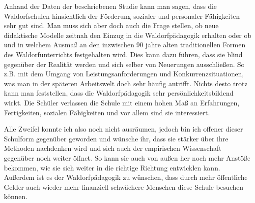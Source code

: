 Anhand der Daten der beschriebenen Studie kann man sagen, dass die Waldorfschulen hinsichtlich der Förderung sozialer und personaler Fähigkeiten sehr gut sind. Man muss sich aber doch auch die Frage stellen, ob neue didaktische Modelle zeitnah den Einzug in die Waldorfpädagogik erhalten oder ob und in welchem Ausmaß an den inzwischen 90 jahre alten traditionellen Formen des Waldorfunterrichts festgehalten wird. Dies kann dazu führen, dass sie blind gegenüber der Realität werden und sich selber von Neuerungen ausschließen. So z.B. mit dem Umgang von Leistungsanforderungen und Konkurrenzsituationen, was man in der späteren Arbeitswelt doch sehr häufig antrifft. Nichts desto trotz kann man feststellen, dass die Waldorfpädagogik sehr persönlichkeitsbildend wirkt. Die Schüler verlassen die Schule mit einem hohen Maß an Erfahrungen, Fertigkeiten, sozialen Fähigkeiten und vor allem sind sie interessiert. 

Alle Zweifel konnte ich also noch nicht ausräumen, jedoch bin ich offener dieser Schulform gegenüber geworden und wünsche ihr, dass sie stärker über ihre Methoden nachdenken wird und sich auch der empirischen Wissenschaft gegenüber noch weiter öffnet. So kann sie auch von außen her noch mehr Anstöße bekommen, wie sie sich weiter in die richtige Richtung entwicklen kann. Außerdem ist es der Waldorfpädagogik zu wünschen, dass durch mehr öffentliche Gelder auch wieder mehr finanziell schwächere Menschen diese Schule besuchen können. 



